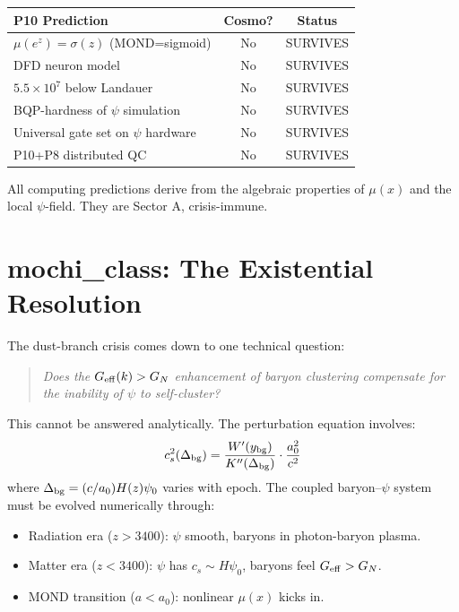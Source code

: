 \documentclass[11pt]{article}
\begin{document}
\begin{table}[h]
\centering
\begin{tabular}{lcc}
\toprule
\textbf{P10 Prediction} & \textbf{Cosmo?} & \textbf{Status} \\
\midrule
$\mu(e^z) = \sigma(z)$ (MOND=sigmoid) & No & SURVIVES \\
DFD neuron model & No & SURVIVES \\
$5.5 \times 10^7$ below Landauer & No & SURVIVES \\
BQP-hardness of $\psi$ simulation & No & SURVIVES \\
Universal gate set on $\psi$ hardware & No & SURVIVES \\
P10+P8 distributed QC & No & SURVIVES \\
\bottomrule
\end{tabular}
\end{table}

All computing predictions derive from the algebraic properties of $\mu(x)$
and the local $\psi$-field. They are Sector A, crisis-immune.

\section{mochi\_class: The Existential Resolution}

The dust-branch crisis comes down to one technical question:

\begin{quote}
\textit{Does the $G_{\rm eff}(k) > G_N$ enhancement of baryon clustering
compensate for the inability of $\psi$ to self-cluster?}
\end{quote}

This cannot be answered analytically. The perturbation equation involves:
\begin{equation}
c_s^2(\Delta_{\rm bg}) = \frac{W'(y_{\rm bg})}{K''(\Delta_{\rm bg})}
\cdot \frac{a_0^2}{c^2}
\end{equation}
where $\Delta_{\rm bg} = (c/a_0) H(z) \psi_0$ varies with epoch.
The coupled baryon--$\psi$ system must be evolved numerically through:

\begin{itemize}
\item Radiation era ($z > 3400$): $\psi$ smooth, baryons in photon-baryon
  plasma.
\item Matter era ($z < 3400$): $\psi$ has $c_s \sim H\psi_0$,
  baryons feel $G_{\rm eff} > G_N$.
\item MOND transition ($a < a_0$): nonlinear $\mu(x)$ kicks in.
\end{itemize}
\end{document}
